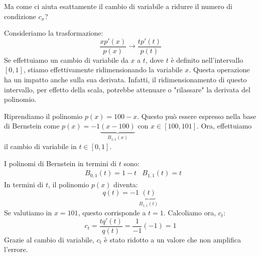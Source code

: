 \documentclass{article}
\begin{document}
Ma come ci aiuta esattamente il cambio di variabile a ridurre il numero di
condizione $c_x$?

Consideriamo la trasformazione:
$$\frac{xp'(x)}{p(x)}\rightarrow \frac{tp'(t)}{p(t)}$$
Se effettuiamo un cambio di variabile da $x$ a $t$, dove $t$ è definito
nell'intervallo $[0,1]$, stiamo effettivamente ridimensionando la variabile $x$.
Questa operazione ha un impatto anche sulla sua derivata. Infatti, il
ridimensionamento di questo intervallo, per effetto della scala, 
potrebbe attenuare o "rilassare" la derivata del polinomio.

\begin{example}
   Riprendiamo il polinomio $p(x)=100-x$. Questo può essere espresso nella
   base di Bernstein come
   $p(x)=-1\underbrace{(x-100)}_{B_{1,1}(x)}$ con $x\in[100,101]$. Ora, 
   effettuiamo il cambio di variabile in $t\in[0,1]$.

   I polinomi di Bernstein in termini di $t$ sono:
   \begin{equation*}
       \begin{aligned}
           & B_{0,1}(t)=1-t & B_{1,1}(t)=t
       \end{aligned}
   \end{equation*}
   In termini di $t$, il polinomio $p(x)$ diventa:
   $$q(t)=-1\underbrace{(t)}_{B_{1,1}(t)}$$
   Se valutiamo in $x=101$, questo corrisponde a $t=1$. Calcoliamo ora, $c_t$:
   $$c_t=\frac{tq'(t)}{q(t)}=\frac{1}{-1}(-1)=1$$
    Grazie al cambio di variabile, $c_t$ è stato ridotto a un valore che non
    amplifica l'errore.
\end{example}
\end{document}
